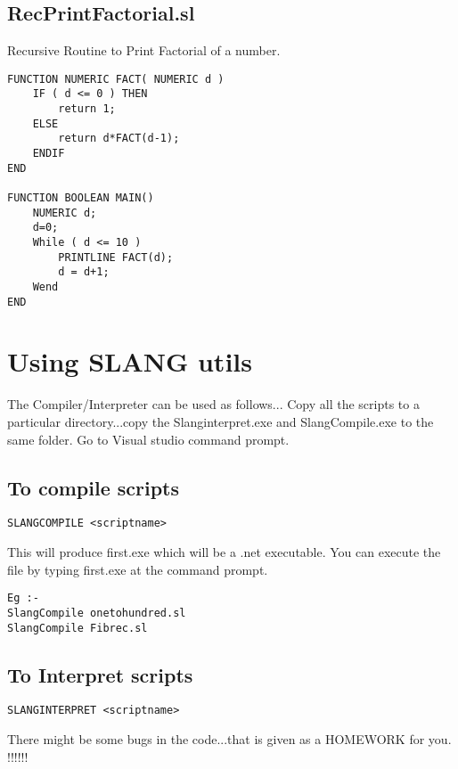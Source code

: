 \subsection{RecPrintFactorial.sl}
Recursive Routine to Print Factorial of a number.
\lstset{style=csharp}
\begin{lstlisting}
FUNCTION NUMERIC FACT( NUMERIC d )
	IF ( d <= 0 ) THEN
		return 1;
	ELSE
		return d*FACT(d-1);
	ENDIF
END

FUNCTION BOOLEAN MAIN()
	NUMERIC d;
	d=0;
	While ( d <= 10 )
		PRINTLINE FACT(d);
		d = d+1;
	Wend
END
\end{lstlisting}
\section{Using SLANG utils}
The Compiler/Interpreter can be used as follows... Copy all the scripts to a particular directory...copy the Slanginterpret.exe and SlangCompile.exe to the same folder. Go to Visual studio command prompt.
\subsection{To compile scripts}
\begin{verbatim}
SLANGCOMPILE <scriptname>
\end{verbatim}
This will produce first.exe which will be a .net executable. You can execute the file by typing first.exe at the command prompt.
\begin{verbatim}
Eg :-
SlangCompile onetohundred.sl
SlangCompile Fibrec.sl
\end{verbatim}
\subsection{To Interpret scripts}
\begin{verbatim}
SLANGINTERPRET <scriptname>
\end{verbatim}
There might be some bugs in the code...that is given as a HOMEWORK for you. !!!!!!

